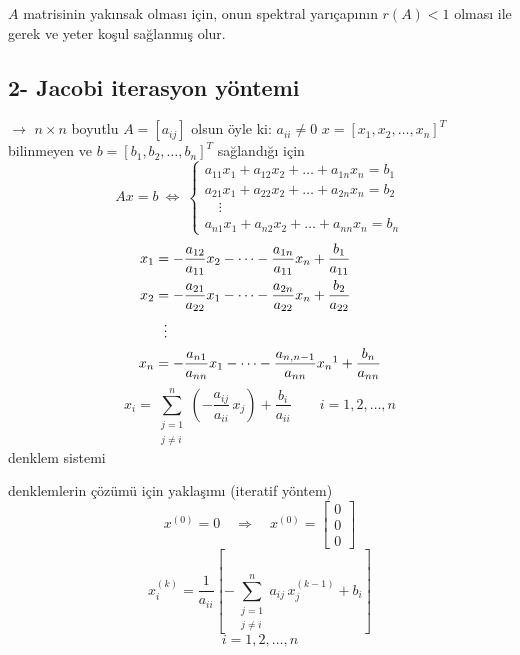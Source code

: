 \documentclass[11pt,a4paper]{article}
\begin{document}
$A$ matrisinin yakınsak olması için, onun spektral yarıçapının $r(A)<1$ olması ile gerek ve yeter
koşul sağlanmış olur.

\subsection{2- Jacobi iterasyon yöntemi}
$\rightarrow$ $n\times n$ boyutlu $A=[a_{ij}]$ olsun öyle ki: \quad $a_{ii}\neq 0$ \quad
$x=[x_1,x_2,\dots,x_n]^T$ bilinmeyen ve $b=[b_1,b_2,\dots,b_n]^T$ sağlandığı için
\[
  Ax=b \ \Leftrightarrow\
  \begin{cases}
    a_{11}x_1+a_{12}x_2+\dots+a_{1n}x_n=b_1\\
    a_{21}x_1+a_{22}x_2+\dots+a_{2n}x_n=b_2\\
    \quad\vdots\\
    a_{n1}x_1+a_{n2}x_2+\dots+a_{nn}x_n=b_n
  \end{cases}
\]
\begin{align*}
  x_1&=-\frac{a_{12}}{a_{11}}x_2-\dots-\frac{a_{1n}}{a_{11}}x_n+\frac{b_1}{a_{11}}\\
  x_2&=-\frac{a_{21}}{a_{22}}x_1-\dots-\frac{a_{2n}}{a_{22}}x_n+\frac{b_2}{a_{22}}\\
  &\ \ \vdots\\
  x_n&=-\frac{a_{n1}}{a_{nn}}x_1-\dots-\frac{a_{n,n-1}}{a_{nn}}x_n\footnotemark+\frac{b_n}{a_{nn}}
\end{align*}
\[
  x_i=\sum_{\substack{j=1\\ j\neq i}}^{n}\left(-\frac{a_{ij}}{a_{ii}}\,x_j\right)+\frac{b_i}{a_{ii}}
  \qquad i=1,2,\dots,n
\]
denklem sistemi

\medskip
denklemlerin çözümü için yaklaşımı (iteratif yöntem)
\[
  x^{(0)}=0 \quad\Rightarrow\quad x^{(0)}=\begin{bmatrix}0\\0\\0\end{bmatrix}
\]
\[
  x_i^{(k)}=\frac{1}{a_{ii}}\left[-\sum_{\substack{j=1\\ j\neq i}}^{n}a_{ij}\,x_j^{(k-1)}+b_i\right]
\]
\[ i=1,2,\dots,n \]
\end{document}
